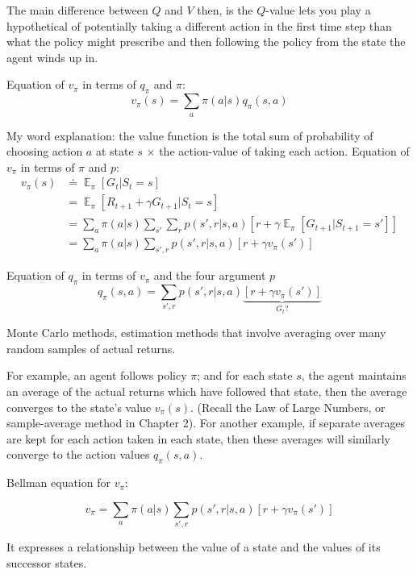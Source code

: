 \documentclass[lang=en,mode=geye,device=normal,color=blue,14pt]{elegantnote}
\DeclareMathOperator*{\E}{\mathbb{E}}
\DeclareMathOperator*{\1}{\mathbbm{1}}
\begin{document}
The main difference between $Q$ and $V$ then, is the $Q$-value lets you play a hypothetical of potentially taking a different action in the first time step than what the policy might prescribe and then following the policy from the state the agent winds up in.
\newline

Equation of $v_\pi$ in terms of $q_\pi$ and $\pi$:
$$ v_\pi(s) = \sum_a \pi(a|s)q_\pi(s,a) $$

My word explanation: the value function is the total sum of probability of choosing action $a$ at state $s$ $\times$ the action-value of taking each action.
\newline
Equation of $v_\pi$ in terms of $\pi$ and $p$:
\begin{align*}
v_\pi(s) & \doteq \E_\pi[G_t | S_t = s]\\
& = \E_\pi[R_{t+1} + \gamma G_{t+1} | S_t = s]\\
& = \sum_a \pi(a|s) \sum_{s'}\sum_r p(s',r|s,a) [r+ \gamma \E_\pi[G_{t+1} | S_{t+1}=s']]\\
& = \sum_a \pi(a|s) \sum_{s',r} p(s',r|s,a) [r+ \gamma v_\pi(s')]
\end{align*}

Equation of $q_\pi$ in terms of $v_\pi$ and the four argument $p$
$$ q_\pi(s,a) = \sum_{s', r} p(s',r|s,a) \underbrace{ [r+\gamma v_\pi(s')] }_{G_t?} $$

\begin{definition}
Monte Carlo methods, estimation methods that involve averaging over many random samples of actual returns.
\end{definition}

For example, an agent follows policy $\pi$; and for each state $s$, the agent maintains an average of the actual returns which have followed that state, then the average converges to the state's value $v_\pi(s)$. (Recall the Law of Large Numbers, or sample-average method in Chapter 2).
For another example, if separate averages are kept for each action taken in each state, then these averages will similarly converge to the action values $q_\pi(s,a)$.

\begin{definition}
Bellman equation for $v_\pi$:

$$ v_\pi = \sum_a \pi(a|s) \sum_{s',r} p(s',r|s,a) [r+ \gamma v_\pi(s')] $$
\end{definition}

It expresses a relationship between the value of a state and the values of its successor states.
\end{document}
